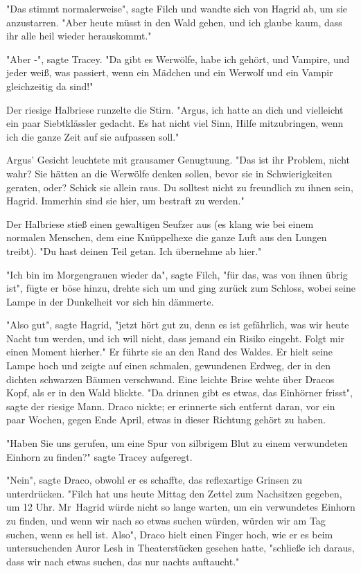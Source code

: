 {"Das stimmt normalerweise", sagte Filch und wandte sich von Hagrid ab, um sie anzustarren. "Aber heute müsst in den Wald gehen, und ich glaube kaum, dass ihr alle heil wieder herauskommt."

"Aber -", sagte Tracey. "Da gibt es Werwölfe, habe ich gehört, und Vampire, und jeder weiß, was passiert, wenn ein Mädchen und ein Werwolf und ein Vampir gleichzeitig da sind!"

Der riesige Halbriese runzelte die Stirn. "Argus, ich hatte an dich und vielleicht ein paar Siebtklässler gedacht. Es hat nicht viel Sinn, Hilfe mitzubringen, wenn ich die ganze Zeit auf sie aufpassen soll."

Argus' Gesicht leuchtete mit grausamer Genugtuung. "Das ist ihr Problem, nicht wahr? Sie hätten an die Werwölfe denken sollen, bevor sie in Schwierigkeiten geraten, oder? Schick sie allein raus. Du solltest nicht zu freundlich zu ihnen sein, Hagrid. Immerhin sind sie hier, um bestraft zu werden."

Der Halbriese stieß einen gewaltigen Seufzer aus (es klang wie bei einem normalen Menschen, dem eine Knüppelhexe die ganze Luft aus den Lungen treibt). "Du hast deinen Teil getan. Ich übernehme ab hier."

"Ich bin im Morgengrauen wieder da", sagte Filch, "für das, was von ihnen übrig ist", fügte er böse hinzu, drehte sich um und ging zurück zum Schloss, wobei seine Lampe in der Dunkelheit vor sich hin dämmerte.

"Also gut", sagte Hagrid, "jetzt hört gut zu, denn es ist gefährlich, was wir heute Nacht tun werden, und ich will nicht, dass jemand ein Risiko eingeht. Folgt mir einen Moment hierher." Er führte sie an den Rand des Waldes. Er hielt seine Lampe hoch und zeigte auf einen schmalen, gewundenen Erdweg, der in den dichten schwarzen Bäumen verschwand. Eine leichte Brise wehte über Dracos Kopf, als er in den Wald blickte. "Da drinnen gibt es etwas, das Einhörner frisst", sagte der riesige Mann. Draco nickte; er erinnerte sich entfernt daran, vor ein paar Wochen, gegen Ende April, etwas in dieser Richtung gehört zu haben.

"Haben Sie uns gerufen, um eine Spur von silbrigem Blut zu einem verwundeten Einhorn zu finden?" sagte Tracey aufgeregt.

"Nein", sagte Draco, obwohl er es schaffte, das reflexartige Grinsen zu unterdrücken. "Filch hat uns heute Mittag den Zettel zum Nachsitzen gegeben, um 12 Uhr. Mr~Hagrid würde nicht so lange warten, um ein verwundetes Einhorn zu finden, und wenn wir nach so etwas suchen würden, würden wir am Tag suchen, wenn es hell ist. Also", Draco hielt einen Finger hoch, wie er es beim untersuchenden Auror Lesh in Theaterstücken gesehen hatte, "schließe ich daraus, dass wir nach etwas suchen, das nur nachts auftaucht."

}
